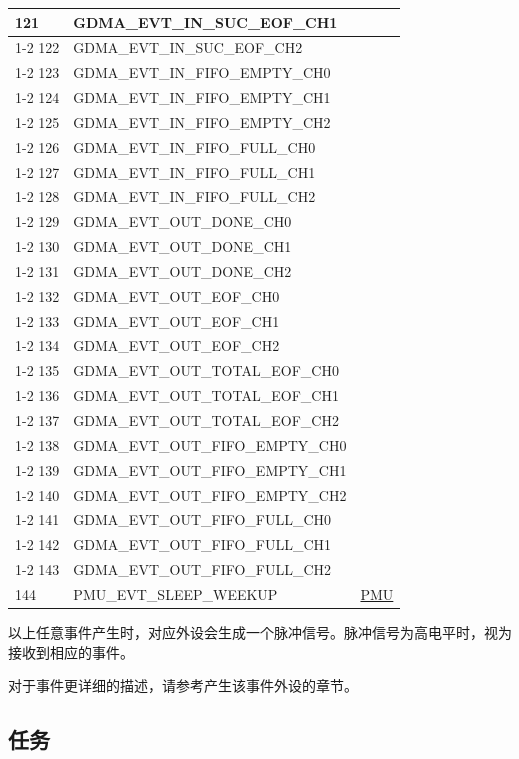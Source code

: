 \documentclass[main\_\_CN.tex]{subfiles}
\begin{document}
\begin{longtable}{ | l | l | l | }
121 & GDMA\_EVT\_IN\_SUC\_EOF\_CH1     & \\ \cline{1-2}
122 & GDMA\_EVT\_IN\_SUC\_EOF\_CH2     & \\ \cline{1-2}
123 & GDMA\_EVT\_IN\_FIFO\_EMPTY\_CH0  & \\ \cline{1-2}
124 & GDMA\_EVT\_IN\_FIFO\_EMPTY\_CH1  & \\ \cline{1-2}
125 & GDMA\_EVT\_IN\_FIFO\_EMPTY\_CH2  & \\ \cline{1-2}
126 & GDMA\_EVT\_IN\_FIFO\_FULL\_CH0   & \\ \cline{1-2}
127 & GDMA\_EVT\_IN\_FIFO\_FULL\_CH1   & \\ \cline{1-2}
128 & GDMA\_EVT\_IN\_FIFO\_FULL\_CH2   & \\ \cline{1-2}
129 & GDMA\_EVT\_OUT\_DONE\_CH0 & \\ \cline{1-2}
130 & GDMA\_EVT\_OUT\_DONE\_CH1 & \\ \cline{1-2}
131 & GDMA\_EVT\_OUT\_DONE\_CH2 & \\ \cline{1-2}
132 & GDMA\_EVT\_OUT\_EOF\_CH0  & \\ \cline{1-2}
133 & GDMA\_EVT\_OUT\_EOF\_CH1  & \\ \cline{1-2}
134 & GDMA\_EVT\_OUT\_EOF\_CH2  & \\ \cline{1-2}
135 & GDMA\_EVT\_OUT\_TOTAL\_EOF\_CH0  & \\ \cline{1-2}
136 & GDMA\_EVT\_OUT\_TOTAL\_EOF\_CH1  & \\ \cline{1-2}
137 & GDMA\_EVT\_OUT\_TOTAL\_EOF\_CH2  & \\ \cline{1-2}
138 & GDMA\_EVT\_OUT\_FIFO\_EMPTY\_CH0 & \\ \cline{1-2}
139 & GDMA\_EVT\_OUT\_FIFO\_EMPTY\_CH1 & \\ \cline{1-2}
140 & GDMA\_EVT\_OUT\_FIFO\_EMPTY\_CH2 & \\ \cline{1-2}
141 & GDMA\_EVT\_OUT\_FIFO\_FULL\_CH0  & \\ \cline{1-2}
142 & GDMA\_EVT\_OUT\_FIFO\_FULL\_CH1  & \\ \cline{1-2}
143 & GDMA\_EVT\_OUT\_FIFO\_FULL\_CH2  & \\ \hline
144 & PMU\_EVT\_SLEEP\_WEEKUP   & \hyperref[mod:lowpowm]{PMU} \\ \hline
\end{longtable}

以上任意事件产生时，对应外设会生成一个脉冲信号。脉冲信号为高电平时，视为接收到相应的事件。

对于事件更详细的描述，请参考产生该事件外设的章节。

\subsection{任务}
\label{sec:evntaskmatrix-tasks}
\end{document}
